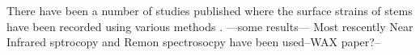 There have been a number of studies published where the surface strains of stems have been recorded using various methods \cite{Muneri_1999} \cite{Yang_2002}\cite{Murphy_2005}. ---some results--- Most rescently  Near Infrared sptrocopy and Remon spectrosocpy have been used--WAX paper?--